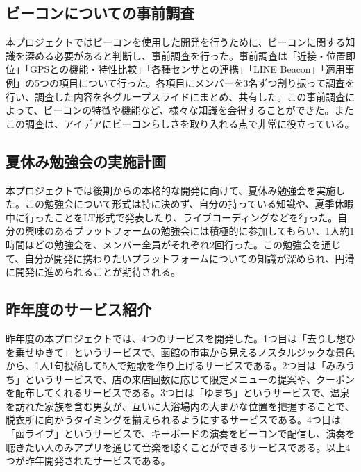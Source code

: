 
\subsection{ビーコンについての事前調査}
本プロジェクトではビーコンを使用した開発を行うために、ビーコンに関する知識を深める必要があると判断し、事前調査を行った。事前調査は「近接・位置即位」「GPSとの機能・特性比較」「各種センサとの連携」「LINE Beacon」「適用事例」の5つの項目について行った。各項目にメンバーを3名ずつ割り振って調査を行い、調査した内容を各グループスライドにまとめ、共有した。この事前調査によって、ビーコンの特徴や機能など、様々な知識を会得することができた。またこの調査は、アイデアにビーコンらしさを取り入れる点で非常に役立っている。

\subsection{夏休み勉強会の実施計画}
本プロジェクトでは後期からの本格的な開発に向けて、夏休み勉強会を実施した。この勉強会について形式は特に決めず、自分の持っている知識や、夏季休暇中に行ったことをLT形式で発表したり、ライブコーディングなどを行った。自分の興味のあるプラットフォームの勉強会には積極的に参加してもらい、1人約1時間ほどの勉強会を、メンバー全員がそれぞれ2回行った。この勉強会を通じて、自分が開発に携わりたいプラットフォームについての知識が深められ、円滑に開発に進められることが期待される。

\subsection{昨年度のサービス紹介}
昨年度の本プロジェクトでは、4つのサービスを開発した。1つ目は「去りし想ひを乗せゆきて」というサービスで、函館の市電から見えるノスタルジックな景色から、1人1句投稿して5人で短歌を作り上げるサービスである。2つ目は「みみうち」というサービスで、店の来店回数に応じて限定メニューの提案や、クーポンを配布してくれるサービスである。3つ目は「ゆまち」というサービスで、温泉を訪れた家族を含む男女が、互いに大浴場内の大まかな位置を把握することで、脱衣所に向かうタイミングを揃えられるようにするサービスである。4つ目は「函ライブ」というサービスで、キーボードの演奏をビーコンで配信し、演奏を聴きたい人のみアプリを通じて音楽を聴くことができるサービスである。以上4つが昨年開発されたサービスである。
